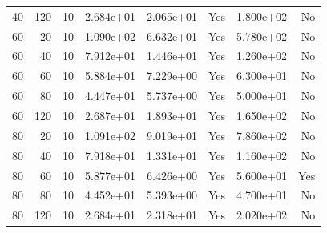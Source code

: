 \documentclass[12pt]{article}
\begin{document}
\begin{table}[H]
\begin{tabular}{rrrrrrrr}
40 & 120 & 10 & 2.684e+01 & 2.065e+01 & Yes & 1.800e+02 & No \\
60 & 20 & 10 & 1.090e+02 & 6.632e+01 & Yes & 5.780e+02 & No \\
60 & 40 & 10 & 7.912e+01 & 1.446e+01 & Yes & 1.260e+02 & No \\
60 & 60 & 10 & 5.884e+01 & 7.229e+00 & Yes & 6.300e+01 & No \\
60 & 80 & 10 & 4.447e+01 & 5.737e+00 & Yes & 5.000e+01 & No \\
60 & 120 & 10 & 2.687e+01 & 1.893e+01 & Yes & 1.650e+02 & No \\
80 & 20 & 10 & 1.091e+02 & 9.019e+01 & Yes & 7.860e+02 & No \\
80 & 40 & 10 & 7.918e+01 & 1.331e+01 & Yes & 1.160e+02 & No \\
80 & 60 & 10 & 5.877e+01 & 6.426e+00 & Yes & 5.600e+01 & Yes \\
80 & 80 & 10 & 4.452e+01 & 5.393e+00 & Yes & 4.700e+01 & No \\
80 & 120 & 10 & 2.684e+01 & 2.318e+01 & Yes & 2.020e+02 & No \\
\bottomrule
\end{tabular}
\end{table}
\end{document}
